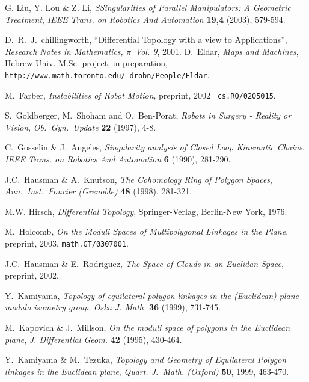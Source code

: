 
\begin{thebibliography}{9}

 G. Liu, Y. Lou \& Z. Li, \emph{SSingularities of Parallel Manipulators: A Geometric Treatment},
\textit{IEEE Trans. on Robotics And Automation} \textbf{19,4}
(2003), 579-594.


 D.\ R.\ J.\ chillingworth,
``Differential Topology with a view to Applications'',
\textit{Research Notes in Mathematics, $\pi$}\ \textit{Vol. 9},
2001.
%
%
%
 D.\ Eldar, \emph{Maps and Machines}, Hebrew Univ. M.Sc. project, in preparation,
{\tt http://www.math.toronto.edu/~drobn/People/Eldar}.

 M.\ Farber, \emph{Instabilities of Robot Motion}, preprint, 2002 \ {\tt cs.RO/0205015}.

 S.\ Goldberger, M.\  Shoham and O.\ Ben-Porat, \emph{Robots in Surgery
- Reality or Vision}, \textit{Ob.\ Gyn.\ Update} \textbf{22}
(1997), 4-8.

 C.\ Gosselin \& J.\ Angeles, \emph{Singularity analysis of Closed Loop
Kinematic Chains}, \textit{IEEE Trans. on Robotics And Automation}
\textbf{6} (1990), 281-290.

 J.C.\ Hausman \& A.\ Knutson, \emph{The Cohomology Ring of Polygon
Spaces}, \textit{Ann.\ Inst.\ Fourier (Grenoble)} \textbf{48}
(1998), 281-321.

 M.W. Hirsch, \textit{Differential Topology}, Springer-\-Verlag,
Berlin-\-New York, 1976.

 M.\ Holcomb, \emph{On the Moduli Spaces of Multipolygonal Linkages in the Plane},
preprint, 2003, {\tt math.GT/0307001}.

 J.C.\ Hausman \& E.\ Rodriguez, \emph{The Space of Clouds in an
Euclidan Space}, preprint, 2002.

 Y.~Kamiyama, \emph{Topology of equilateral polygon linkages in the
(Euclidean) plane modulo isometry group}, \textit{Oska J. Math.}
\textbf{36} (1999), 731-745.

 M.\ Kapovich \& J.\ Millson, \emph{On the moduli space of polygons in
the Euclidean plane}, \textit{J. Differential Geom.} \textbf{42}
(1995), 430-464.

 Y.\ Kamiyama \& M.\ Tezuka, \emph{Topology and Geometry of Equilateral
Polygon linkages in the Euclidean plane}, \textit{Quart. J.\ Math.
(Oxford)} \textbf{50}, 1999, 463-470.


\end{thebibliography}
